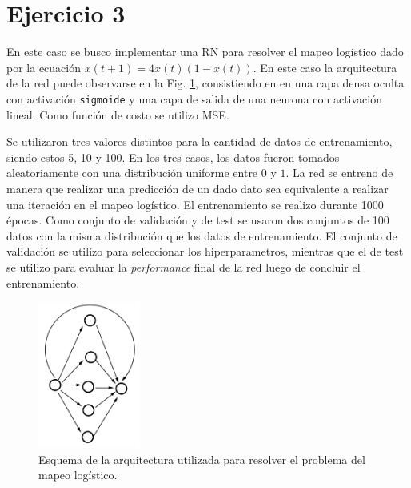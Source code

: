 \section*{Ejercicio 3}
\graphicspath{{Figuras/}}

En este caso se busco implementar una RN para resolver el mapeo logístico dado por la ecuación ${{x(t+1) = 4x(t)(1-x(t))}}$. En este caso la arquitectura de la red puede observarse en la Fig. \ref{03:fig:Arquitectura}, consistiendo en en una capa densa oculta con activación \texttt{sigmoide} y una capa de salida de una neurona con activación lineal. Como función de costo se utilizo MSE. 

Se utilizaron tres valores distintos para la cantidad de datos de entrenamiento, siendo estos 5, 10 y 100. En los tres casos, los datos fueron tomados aleatoriamente con una distribución uniforme entre $0$ y $1$. La red se entreno de manera que realizar una predicción de un dado dato sea equivalente a realizar una iteración en el mapeo logístico. El entrenamiento se realizo durante 1000 épocas. Como conjunto de validación y de test se usaron dos conjuntos de 100 datos con la misma distribución que los datos de entrenamiento. El conjunto de validación se utilizo para seleccionar los hiperparametros, mientras que el de test se utilizo para evaluar la \textit{performance} final de la red luego de concluir el entrenamiento.



\begin{figure}[h!]
    \centering
    \includegraphics[width=0.3\textwidth]{Figuras/ejer_3.png}
    \caption{Esquema de la arquitectura utilizada para resolver el problema del mapeo logístico.}
    \label{03:fig:Arquitectura}
\end{figure}

